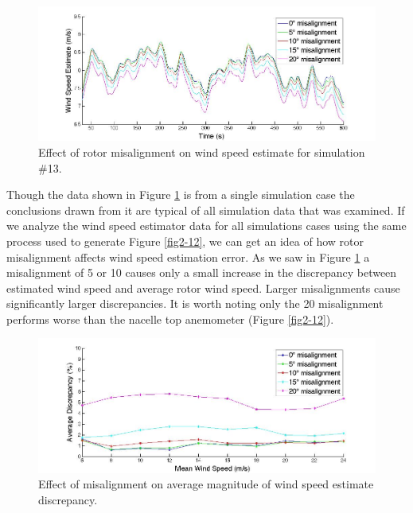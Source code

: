 \begin{figure}[ht]
	\centering
		\includegraphics[width = \linewidth]{Figures/ch2Figures/fig2-20.jpg}
		
	\caption{Effect of rotor misalignment on wind speed estimate for simulation \#13.}
	\label{fig2-20}
\end{figure}

Though the data shown in Figure \ref{fig2-20} is from a single simulation case the conclusions drawn from it are typical of all simulation data that was examined. If we analyze the wind speed estimator data for all simulations cases using the same process used to generate Figure \ref{fig2-12}, we can get an idea of how rotor misalignment affects wind speed estimation error. As we saw in Figure \ref{fig2-20} a misalignment of 5\degree{} or 10\degree{} causes only a small increase in the discrepancy between estimated wind speed and average rotor wind speed. Larger misalignments cause significantly larger discrepancies. It is worth noting only the 20\degree{} misalignment performs worse than the nacelle top anemometer (Figure \ref{fig2-12}).

\begin{figure}[ht]
	\centering
		\includegraphics[width = \linewidth]{Figures/ch2Figures/fig2-21.jpg}
		
	\caption{Effect of misalignment on average magnitude of wind speed estimate discrepancy.}
	\label{fig2-21}
\end{figure}



